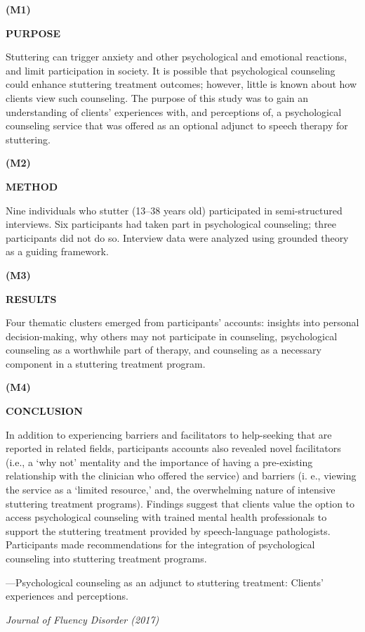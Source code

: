 \documentclass{ctexbook}
\begin{document}
\begin{sample}[label={myautocounter}]{\heiti}

\textbf{(M1)}

\textbf{PURPOSE }

Stuttering can trigger anxiety and other psychological and emotional reactions, and limit participation in society. It is possible that psychological counseling could enhance stuttering treatment outcomes; however, little is known about how clients view such counseling. The purpose of this study was to gain an understanding of clients' experiences with, and perceptions of, a psychological counseling service that was offered as an optional adjunct to speech therapy for stuttering.

\textbf{(M2)}

\textbf{METHOD }

Nine individuals who stutter (13--38 years old) participated in semi-structured interviews. Six participants had taken part in psychological counseling; three participants did not do so. Interview data were analyzed using grounded theory as a guiding framework.

\textbf{(M3)}

\textbf{RESULTS }

Four thematic clusters emerged from participants' accounts: insights into personal decision-making, why others may not participate in counseling, psychological counseling as a worthwhile part of therapy, and counseling as a necessary component in a stuttering treatment program.

\textbf{(M4)}

\textbf{CONCLUSION}

In addition to experiencing barriers and facilitators to help-seeking that are reported in related fields, participants accounts also revealed novel facilitators (i.e., a `why not' mentality and the importance of having a pre-existing relationship with the clinician who offered the service) and barriers (i. e., viewing the service as a `limited resource,' and, the overwhelming nature of intensive stuttering treatment programs). Findings suggest that clients value the option to access psychological counseling with trained mental health professionals to support the stuttering treatment provided by speech-language pathologists. Participants made recommendations for the integration of psychological counseling into stuttering treatment programs.

\begin{flushright}
  ---Psychological counseling as an adjunct to stuttering treatment: Clients' experiences and perceptions. 
  
  \emph{Journal of Fluency Disorder (2017)}
\end{flushright}


\end{sample}
\end{document}
